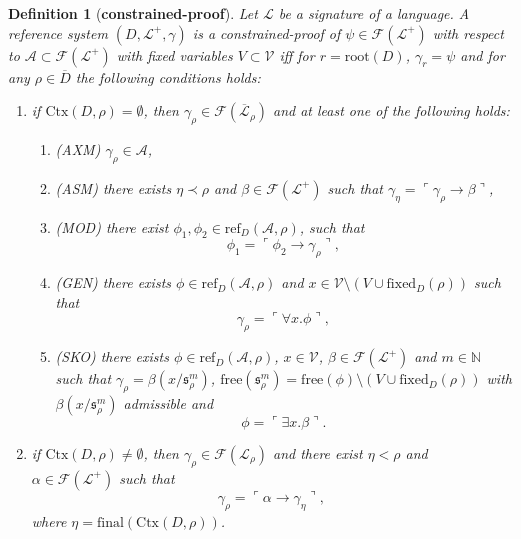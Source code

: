 \documentclass[10pt]{article}
\theoremstyle{plain}
\newtheorem{definition}[theorem]{Definition}
\newcommand{\free}{\text{free}}
\newcommand{\sk}{\mathfrak{s}}
\newcommand{\N}{\mathbb{N}}
\newcommand{\F}{\mathcal{F}}
\renewcommand{\root}{\text{root}}
\newcommand{\final}{\text{final}}
\newcommand{\context}{\text{Ctx}}
\renewcommand{\L}{\mathscr{L}}
\newcommand{\V}{\mathscr{V}}
\newcommand{\fixed}{\text{fixed}}
\newcommand{\refset}{\text{ref}}
\begin{document}
\begin{definition}[\textbf{constrained-proof}]
\label{constrained-proof}
Let $\L$ be a signature of a language.
A reference system $(D, \L^+,\gamma)$ is a constrained-proof of $\psi\in\F(\L^+)$ with respect to $\mathcal{A}\subset \F(\L^+)$ with fixed variables $V\subset \V$ iff for $r = \root(D)$, $\gamma_r = \psi$
and for any $\rho\in \overline{D}$ the following conditions holds:
\begin{enumerate}
\item \label{shallow-part} if $\context(D, \rho) = \emptyset$, then $\gamma_\rho\in\F(\overline{\L}_\rho)$ and at least one of the following holds:
\begin{enumerate}
\item (AXM) $\gamma_\rho\in \mathcal{A}$,
\item (ASM) there exists $\eta \prec \rho$ and $\beta\in \F(\L^+)$
such that $\gamma_\eta = \ulcorner \gamma_\rho \to \beta \urcorner$,
\item (MOD) there exist $\phi_1, \phi_2\in \refset_D(\mathcal{A}, \rho)$, such that
\begin{equation}
\phi_1 = \ulcorner \phi_2 \to \gamma_\rho \urcorner,
\end{equation}
\item (GEN) there exists $\phi \in \refset_D(\mathcal{A}, \rho)$ and $x\in \V\setminus (V \cup \fixed_D(\rho))$ such that
\begin{equation}
\gamma_\rho = \ulcorner \forall x. \phi \urcorner,
\end{equation}

\item (SKO) there exists $\phi \in \refset_D(\mathcal{A}, \rho)$, $x\in \V$, $\beta\in \F(\L^+)$ and $m\in\N$ such that
$\gamma_\rho = \beta(x/\sk^m_\rho)$, 
$\free(\sk^m_\rho) = \free(\phi) \setminus (V \cup \fixed_D(\rho))$ with $\beta(x/\sk^m_\rho)$ admissible and
\begin{equation}
\phi = \ulcorner \exists x. \beta\urcorner. 
\end{equation}
\end{enumerate}
\item if $\context(D, \rho) \not= \emptyset$, then $\gamma_\rho\in \F(\L_\rho)$ and there exist $\eta < \rho$ and $\alpha\in\F(\L^+)$
 such that
\begin{equation}
\gamma_\rho = \ulcorner \alpha \to \gamma_\eta \urcorner,
\end{equation}
where $\eta = \final(\context(D, \rho))$.
\end{enumerate}
\end{definition}
\end{document}
